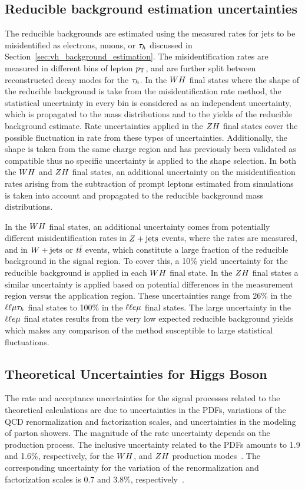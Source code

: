 \subsection{Reducible background estimation uncertainties}
The reducible backgrounds are estimated using the measured rates for jets to be 
misidentified as electrons, muons, or $\tau_{h}$ discussed in 
Section~\ref{sec:vh_background_estimation}. The misidentification rates are 
measured in different bins of lepton $p_\mathrm{T}$, and are further split between 
reconstructed decay modes for the $\tau_{h}$. In the $WH$ final states where
the shape of the reducible background is take from the misidentification rate
method, the statistical uncertainty in every 
bin is considered as an independent uncertainty, which is propagated to the mass 
distributions and to the yields of the reducible background estimate. Rate
uncertainties applied in the $ZH$ final states cover the possible fluctuation
in rate from these types of uncertainties. Additionally, the shape is taken from the same charge
region and has previously been validated as compatible thus no specific
uncertainty is applied to the shape selection.
In both the $WH$ and $ZH$ final states, an additional
uncertainty on the misidentification rates arising from the subtraction of 
prompt leptons estimated from simulations is taken into account and propagated to 
the reducible background mass distributions. 

In the $WH$ final states, an 
additional uncertainty comes from potentially different misidentification rates 
in $Z+\textrm{jets}$ events, where the rates are measured, and in $W+\textrm{jets}$ or 
$t\bar{t}$ events, which constitute a large fraction of the reducible background 
in the signal region. To cover this, a 10\% yield uncertainty for the reducible 
background is applied in each $WH$ final state. In the $ZH$ final
states a similar uncertainty is applied based on potential differences in the
measurement region versus the application region. These uncertainties
range from 26\% in the $\ell\ell\mu\tau_{h}$ final states to 100\% in the
$\ell\ell e\mu$ final states. The large uncertainty in the $\ell\ell e\mu$ 
final states results from the very low expected reducible background yields 
which makes any comparison of the method susceptible to large statistical fluctuations.


\subsection{Theoretical Uncertainties for Higgs Boson}
The rate and acceptance uncertainties for the signal processes related to the 
theoretical calculations are due to uncertainties in the PDFs, variations of 
the QCD renormalization and factorization scales, and uncertainties in the 
modeling of parton showers. The magnitude of the rate uncertainty depends on 
the production process.
The inclusive uncertainty related to the PDFs amounts to 1.9 and 1.6\%, 
respectively, for the $WH$, and $ZH$ production modes~\cite{deFlorian:2016spz}. The
corresponding uncertainty for the variation of the renormalization and 
factorization scales is 0.7 and 3.8\%, respectively~\cite{deFlorian:2016spz}.


